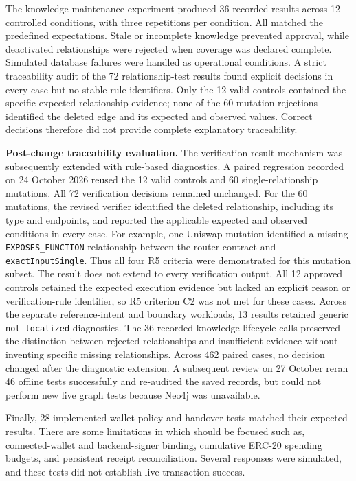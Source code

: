 The knowledge-maintenance experiment produced 36 recorded results
across 12 controlled conditions, with three repetitions per condition.
All matched the predefined expectations. Stale or incomplete knowledge
prevented approval, while deactivated relationships were rejected when
coverage was declared complete. Simulated database failures were handled
as operational conditions. A strict traceability audit of the 72 relationship-test results found
explicit decisions in every case but no stable rule identifiers. Only
the 12 valid controls contained the specific expected relationship evidence;
none of the 60 mutation rejections identified the deleted edge and its
expected and observed values. Correct decisions therefore did not provide
complete explanatory traceability.

\noindent\textbf{Post-change traceability evaluation.}
The verification-result mechanism was subsequently extended with
rule-based diagnostics. A paired regression recorded on 24 October 2026
reused the 12 valid controls and 60 single-relationship mutations. All
72 verification decisions remained unchanged. For the 60 mutations,
the revised verifier identified the deleted relationship, including
its type and endpoints, and reported the applicable expected and
observed conditions in every case. For example, one Uniswap mutation
identified a missing \texttt{EXPOSES\_FUNCTION} relationship between the
router contract and \texttt{exactInputSingle}. Thus all four R5
criteria were demonstrated for this mutation subset. The result does not extend to every verification output. All 12 approved
controls retained the expected execution evidence but lacked an explicit
reason or verification-rule identifier, so R5 criterion C2 was not met
for these cases. Across the separate reference-intent and boundary
workloads, 13 results retained generic \texttt{not\_localized} diagnostics.
The 36 recorded knowledge-lifecycle calls preserved the distinction
between rejected relationships and insufficient evidence without
inventing specific missing relationships. Across 462 paired cases,
no decision changed after the diagnostic extension. A subsequent review
on 27 October reran 46 offline tests successfully and re-audited the
saved records, but could not perform new live graph tests because Neo4j
was unavailable.


Finally, 28 implemented wallet-policy and handover tests matched their
expected results. There are some limitations in which should be focused such as,
connected-wallet and backend-signer binding, cumulative ERC-20 spending
budgets, and persistent receipt reconciliation. Several responses were
simulated, and these tests did not establish live transaction success.

